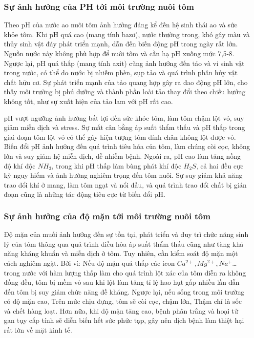 \documentclass{article} %
\begin{document}
	\subsubsection{ Sự ảnh hưởng của PH tới môi trường nuôi tôm}
	
	Theo \cite{NuoiTom} pH của nước ao nuôi tôm ảnh hưởng đáng kể đến hệ sinh thái ao và sức khỏe tôm. Khi pH quá cao (mang tính bazơ), nước thường trong, khó gây màu và thủy sinh vật đáy phát triển mạnh, dẫn đến biến động pH trong ngày rất lớn. Nguồn nước này không phù hợp để nuôi tôm và cần hạ pH xuống mức 7,5-8. Ngược lại, pH quá thấp (mang tính axit) cũng ảnh hưởng đến tảo và vi sinh vật trong nước, có thể do nước bị nhiễm phèn, sụp tảo và quá trình phân hủy vật chất hữu cơ. Sự phát triển mạnh của tảo quang hợp gây ra dao động pH lớn, cho thấy môi trường bị phú dưỡng và thành phần loài tảo thay đổi theo chiều hướng không tốt, như sự xuất hiện của tảo lam với pH rất cao.
	
	pH vượt ngưỡng ảnh hưởng bất lợi đến sức khỏe tôm, làm tôm chậm lột vỏ, suy giảm miễn dịch và stress. Sự mất cân bằng áp suất thẩm thấu và pH thấp trong giai đoạn tôm lột vỏ có thể gây hiện tượng tôm dính chân không lột được vỏ. Biến đổi pH ảnh hưởng đến quá trình tiêu hóa của tôm, làm chúng còi cọc, không lớn và suy giảm hệ miễn dịch, dễ nhiễm bệnh. Ngoài ra, pH cao làm tăng nồng độ khí độc $NH_3$, trong khi pH thấp làm bùng phát khí độc $H_2S$, cả hai đều cực kỳ nguy hiểm và ảnh hưởng nghiêm trọng đến tôm nuôi. Sự suy giảm khả năng trao đổi khí ở mang, làm tôm ngạt và nổi đầu, và quá trình trao đổi chất bị gián đoạn cũng là những tác động tiêu cực từ biến đổi pH.
	
	\subsubsection{ Sự ảnh hưởng của độ mặn tới môi trường nuôi tôm}
	
	Độ mặn của muối ảnh hưởng đến sự tồn tại, phát triển và duy trì chức năng sinh lý của tôm thông qua quá trình điều hòa áp suất thẩm thấu cũng như tăng khả năng kháng khuẩn và miễn dịch ở tôm. Tuy nhiên, cần kiểm soát độ mặn một cách nghiêm ngặt. Bởi vì: Nếu độ mặn quá thấp các icon $Ca^{2+}, Mg^{2+}, Na^{+}$… trong nước với hàm lượng thấp làm cho quá trình lột xác của tôm diễn ra không đồng đều, tôm bị mềm vỏ sau khi lột làm tăng tỉ lệ hao hụt gấp nhiều lần dẫn đến tôm bị suy giảm chức năng đề kháng. Ngược lại, nếu sống trong môi trường có độ mặn cao, Trên mức chịu đựng, tôm sẽ còi cọc, chậm lớn, Thậm chí là sốc và chết hàng loạt. Hơn nữa, khi độ mặn tăng cao, bệnh phân trắng và hoại tử gan tụy cấp tính sẽ diễn biến hết sức phức tạp, gây nên dịch bệnh làm thiệt hại rất lớn về mặt kinh tế. 
	
\end{document}
